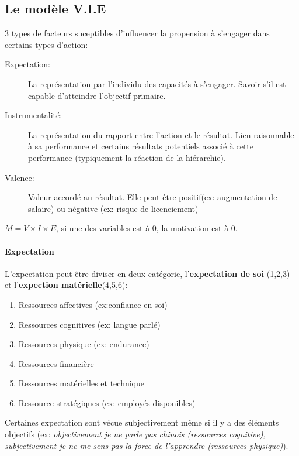 \documentclass[11pt]{article} %
\begin{document}
\subsection{Le modèle V.I.E}

3 types de facteurs suceptibles d'influencer la propension à s'engager
dans certains types d'action:

\begin{description}
 \item[Expectation: ] La représentation par l'individu des capacités
à s'engager. Savoir s'il est capable d'atteindre l'objectif primaire.

 \item[Instrumentalité: ] La représentation du rapport entre l'action
et le résultat. Lien raisonnable à sa performance et certains
résultats potentiels associé à cette performance (typiquement la
réaction de la hiérarchie).

 \item[Valence: ] Valeur accordé au résultat. Elle peut être
positif(ex: augmentation de salaire) ou négative (ex: risque de
licenciement)

\end{description}
$M=V\times I \times E$, si une des variables est à 0, la motivation est à 0. 

\paragraph{Expectation} L'expectation peut être diviser en deux catégorie, l'\textbf{expectation de soi}
(1,2,3) et l'\textbf{expection matérielle}(4,5,6):
\begin{multicols}{2}
	\begin{enumerate}
		\item Ressources affectives (ex:confiance en soi)
		\item Ressources cognitives (ex: langue parlé)
		\item Ressources physique (ex: endurance)
		\item Ressources financière
		\item Ressources matérielles et technique
		\item Ressource stratégiques (ex: employés disponibles)
	\end{enumerate}
\end{multicols}

Certaines expectation sont vécue subjectivement même si il y a des éléments objectifs (ex: \textit{objectivement je ne parle pas chinois (ressources cognitive), subjectivement je ne me sens pas la force de l'apprendre (ressources physique)}).
\end{document}
